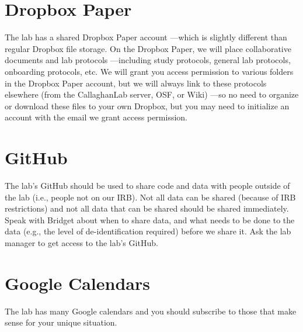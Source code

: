 \documentclass[]{book}
\begin{document}
\hypertarget{dropbox-paper}{%
\section{Dropbox Paper}\label{dropbox-paper}}

The lab has a shared Dropbox Paper account ---which is slightly different than regular Dropbox file storage. On the Dropbox Paper, we will place collaborative documents and lab protocols ---including study protocols, general lab protocols, onboarding protocols, etc. We will grant you access permission to various folders in the Dropbox Paper account, but we will always link to these protocols elsewhere (from the CallaghanLab server, OSF, or Wiki) ---so no need to organize or download these files to your own Dropbox, but you may need to initialize an account with the email we grant access permission.

\hypertarget{github}{%
\section{GitHub}\label{github}}

The lab's GitHub should be used to share code and data with people outside of the lab (i.e., people not on our IRB). Not all data can be shared (because of IRB restrictions) and not all data that can be shared should be shared immediately. Speak with Bridget about when to share data, and what needs to be done to the data (e.g., the level of de-identification required) before we share it. Ask the lab manager to get access to the lab's GitHub.

\hypertarget{google-calendars}{%
\section{Google Calendars}\label{google-calendars}}

The lab has many Google calendars and you should subscribe to those that make sense for your unique situation.
\end{document}

